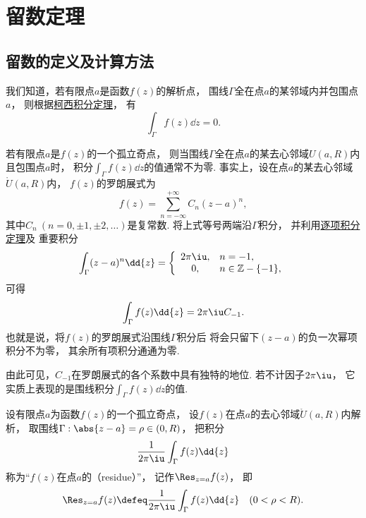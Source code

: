 \section{留数定理}
\subsection{留数的定义及计算方法}
我们知道，若有限点\(a\)是函数\(f(z)\)的解析点，
围线\(\Gamma\)全在点\(a\)的某邻域内并包围点\(a\)，
则根据\hyperref[theorem:解析函数的积分表示.柯西积分定理]{柯西积分定理}，
有\begin{equation*}
	\int_\Gamma f(z) \dd{z} = 0.
\end{equation*}

若有限点\(a\)是\(f(z)\)的一个孤立奇点，
则当围线\(\Gamma\)全在点\(a\)的某去心邻域\(U(a,R)\)内且包围点\(a\)时，
积分\(\int_\Gamma f(z) \dd{z}\)的值通常不为零.
事实上，设在点\(a\)的某去心邻域\(\mathring{U}(a,R)\)内，
\(f(z)\)的罗朗展式为\begin{equation*}
	f(z) = \sum_{n=-\infty}^{+\infty} C_n (z-a)^n,
\end{equation*}
其中\(C_n\ (n=0,\pm1,\pm2,\dotsc)\)是复常数.
将上式等号两端沿\(\Gamma\)积分，
并利用\hyperref[theorem:解析函数的级数表示.一致收敛级数的基本性质2]{逐项积分定理}及
重要积分  \begin{equation*}
	\int_\Gamma (z-a)^n \dd{z} = \left\{ \begin{array}{cl}
		2\pi\iu, & n=-1, \\
		0,& n\in\mathbb{Z}-\{-1\},
	\end{array} \right.
\end{equation*}
可得\begin{equation*}
	\int_\Gamma f(z) \dd{z} = 2\pi\iu C_{-1}.
\end{equation*}
也就是说，将\(f(z)\)的罗朗展式沿围线\(\Gamma\)积分后
将会只留下\((z-a)\)的负一次幂项积分不为零，
其余所有项积分通通为零.

由此可见，\(C_{-1}\)在罗朗展式的各个系数中具有独特的地位.
若不计因子\(2\pi\iu\)，
它实质上表现的是围线积分\(\int_\Gamma f(z) \dd{z}\)的值.

\begin{definition}
设有限点\(a\)为函数\(f(z)\)的一个孤立奇点，
设\(f(z)\)在点\(a\)的去心邻域\(\mathring{U}(a,R)\)内解析，
取围线\(\Gamma: \abs{z-a}=\rho\in(0,R)\)，
把积分\begin{equation*}
	\frac{1}{2\pi\iu} \int_\Gamma f(z) \dd{z}
\end{equation*}
称为“\(f(z)\)在点\(a\)的（residue）”，
记作\(\Res_{z=a} f(z)\)，
即\begin{equation}\label{equation:留数定理.留数定义1}
	\Res_{z=a} f(z)
	\defeq
	\frac{1}{2\pi\iu} \int_\Gamma f(z) \dd{z}
	\quad(0<\rho<R).
\end{equation}
\end{definition}

